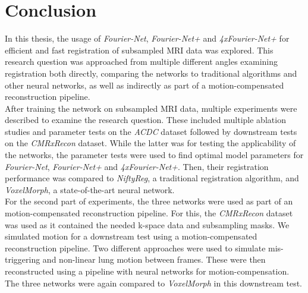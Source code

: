 
\chapter{Conclusion} \label{Ch:Conclusion}
In this thesis, the usage of \emph{Fourier-Net}, \emph{Fourier-Net+} and \emph{4xFourier-Net+} for efficient and fast registration of subsampled MRI data was explored. This research question was approached from multiple different angles examining registration both directly, comparing the networks to traditional algorithms and other neural networks, as well as indirectly as part of a motion-compensated reconstruction pipeline. \\
After training the network on subsampled MRI data, multiple experiments were described to examine the research question. These included multiple ablation studies and parameter tests on the \emph{ACDC} dataset followed by downstream tests on the \emph{CMRxRecon} dataset. While the latter was for testing the applicability of the networks, the parameter tests were used to find optimal model parameters for \emph{Fourier-Net}, \emph{Fourier-Net+} and \emph{4xFourier-Net+}. Then, their registration performance was compared to \emph{NiftyReg}, a traditional registration algorithm, and \emph{VoxelMorph}, a state-of-the-art neural network.\\
For the second part of experiments, the three networks were used as part of an motion-compensated reconstruction pipeline. For this, the \emph{CMRxRecon} dataset was used as it contained the needed k-space data and subsampling masks. We simulated motion for a downstream test using a motion-compensated reconstruction pipeline. Two different approaches were used to simulate mis-triggering and non-linear lung motion between frames. These were then reconstructed using a pipeline with neural networks for motion-compensation. The three networks were again compared to \emph{VoxelMorph} in this downstream test.